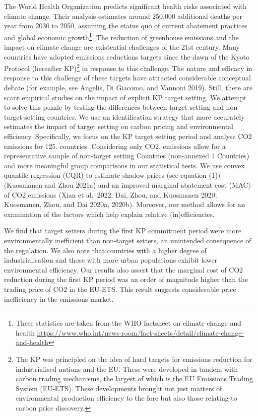 \documentclass[
  letterpaper,
  DIV=11,
  numbers=noendperiod]{scrartcl}
\begin{document}
The World Health Organization predicts significant health risks
associated with climate change. Their analysis estimates around 250,000
additional deaths per year from 2030 to 2050, assuming the status quo of
current abatement practices and global economic growth\footnote{These
  statistics are taken from the WHO factsheet on climate change and
  health
  \url{https://www.who.int/news-room/fact-sheets/detail/climate-change-and-health}}.
The reduction of greenhouse emissions and the impact on climate change
are existential challenges of the 21st century. Many countries have
adopted emissions reductions targets since the dawn of the Kyoto
Protocol (hereafter KP)\footnote{The KP was principled on the idea of
  hard targets for emissions reduction for industrialised nations and
  the EU. These were developed in tandem with carbon trading mechanisms,
  the largest of which is the EU Emissions Trading System (EU-ETS).
  These developments brought not just matters of environmental
  production efficiency to the fore but also those relating to carbon
  price discovery.} in response to this challenge. The nature and
efficacy in response to this challenge of these targets have attracted
considerable conceptual debate (for example, see Angelis, Di Giacomo,
and Vannoni 2019). Still, there are scant empirical studies on the
impact of explicit KP target setting. We attempt to solve this puzzle by
testing the differences between target-setting and non-target-setting
countries. We use an identification strategy that more accurately
estimates the impact of target setting on carbon pricing and
environmental efficiency. Specifically, we focus on the KP target
setting period and analyse CO2 emissions for 125. countries. Considering
only CO2. emissions allow for a representative sample of non-target
setting Countries (non-annexed 1 Countries) and more meaningful group
comparisons in our statistical tests. We use convex quantile regression
(CQR) to estimate shadow prices (see equation (1))(Kuosmanen and Zhou
2021a) and an improved marginal abatement cost (MAC) of CO2 emissions
(Xian et al.~2022; Dai, Zhou, and Kuosmanen 2020; Kuosmanen, Zhou, and
Dai 2020a, 2020b). Moreover, our method allows for an examination of the
factors which help explain relative (in)efficiencies.

We find that target setters during the first KP commitment period were
more environmentally inefficient than non-target setters, an unintended
consequence of the regulation. We also note that countries with a higher
degree of industrialisation and those with more urban populations
exhibit lower environmental efficiency. Our results also assert that the
marginal cost of CO2 reduction during the first KP period was an order
of magnitude higher than the trading price of CO2 in the EU-ETS. This
result suggests considerable price inefficiency in the emissions market.
\end{document}
